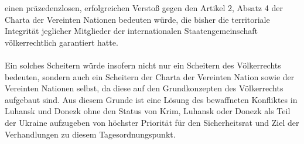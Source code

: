 \documentclass[a4paper,11pt]{article}
\begin{document}
einen präzedenzlosen, erfolgreichen Verstoß gegen den Artikel 2, Absatz 4 der Charta der Vereinten Nationen bedeuten würde, die bisher die territoriale Integrität jeglicher Mitglieder der internationalen Staatengemeinschaft völkerrechtlich garantiert hatte. \\ \\ Ein solches Scheitern würde insofern nicht nur ein Scheitern des Völkerrechts bedeuten, sondern auch ein Scheitern der Charta der Vereinten Nation sowie der Vereinten Nationen selbst, da diese auf den Grundkonzepten des Völkerrechts aufgebaut sind. Aus diesem Grunde ist eine Lösung des bewaffneten Konfliktes in Luhansk und Donezk ohne den Status von Krim, Luhansk oder Donezk als Teil der Ukraine aufzugeben von höchster Priorität für den Sicherheitsrat und Ziel der Verhandlungen zu diesem Tagesordnungspunkt.  
\end{document}
